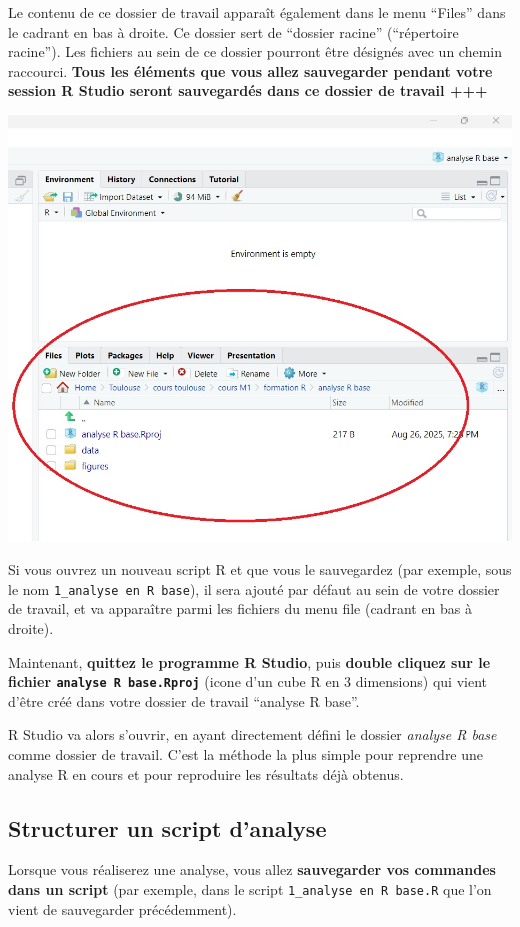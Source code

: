 \documentclass[
]{book}
\begin{document}
Le contenu de ce dossier de travail apparaît également dans le menu ``Files'' dans le cadrant en bas à droite. Ce dossier sert de ``dossier racine'' (``répertoire racine''). Les fichiers au sein de ce dossier pourront être désignés avec un chemin raccourci. \textbf{Tous les éléments que vous allez sauvegarder pendant votre session R Studio seront sauvegardés dans ce dossier de travail +++}

\begin{center}\includegraphics[width=0.75\linewidth]{./images/working_directory} \end{center}

Si vous ouvrez un nouveau script R et que vous le sauvegardez (par exemple, sous le nom \texttt{1\_analyse\ en\ R\ base}), il sera ajouté par défaut au sein de votre dossier de travail, et va apparaître parmi les fichiers du menu file (cadrant en bas à droite).

Maintenant, \textbf{quittez le programme R Studio}, puis \textbf{double cliquez sur le fichier \texttt{analyse\ R\ base.Rproj}} (icone d'un cube R en 3 dimensions) qui vient d'être créé dans votre dossier de travail ``analyse R base''.

R Studio va alors s'ouvrir, en ayant directement défini le dossier \emph{analyse R base} comme dossier de travail. C'est la méthode la plus simple pour reprendre une analyse R en cours et pour reproduire les résultats déjà obtenus.

\subsection{Structurer un script d'analyse}\label{structurer-un-script-danalyse}

Lorsque vous réaliserez une analyse, vous allez \textbf{sauvegarder vos commandes dans un script} (par exemple, dans le script \texttt{1\_analyse\ en\ R\ base.R} que l'on vient de sauvegarder précédemment).
\end{document}
